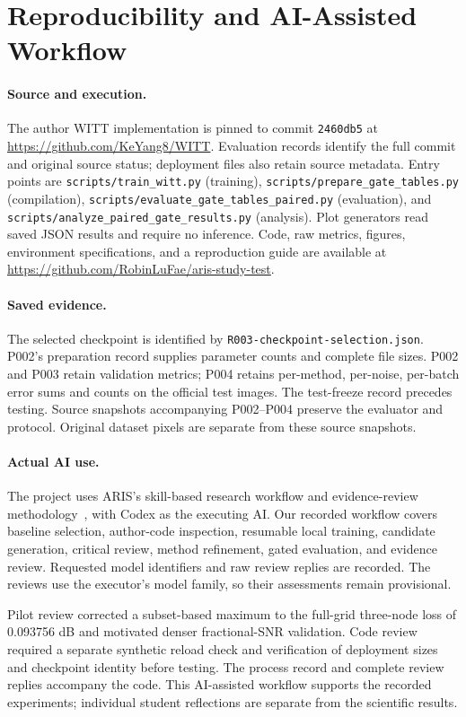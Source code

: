 \section{Reproducibility and AI-Assisted Workflow}
\paragraph{Source and execution.}
The author WITT implementation is pinned to commit \texttt{2460db5} at \url{https://github.com/KeYang8/WITT}. Evaluation records identify the full commit and original source status; deployment files also retain source metadata. Entry points are \nolinkurl{scripts/train_witt.py} (training), \nolinkurl{scripts/prepare_gate_tables.py} (compilation), \nolinkurl{scripts/evaluate_gate_tables_paired.py} (evaluation), and \nolinkurl{scripts/analyze_paired_gate_results.py} (analysis). Plot generators read saved JSON results and require no inference. Code, raw metrics, figures, environment specifications, and a reproduction guide are available at \url{https://github.com/RobinLuFae/aris-study-test}.

\paragraph{Saved evidence.}
The selected checkpoint is identified by \texttt{R003-checkpoint-selection.json}. P002's preparation record supplies parameter counts and complete file sizes. P002 and P003 retain validation metrics; P004 retains per-method, per-noise, per-batch error sums and counts on the official test images. The test-freeze record precedes testing. Source snapshots accompanying P002--P004 preserve the evaluator and protocol. Original dataset pixels are separate from these source snapshots.

\paragraph{Actual AI use.}
The project uses ARIS's skill-based research workflow and evidence-review methodology~\cite{yin2026aris,yang2026aris}, with Codex as the executing AI. Our recorded workflow covers baseline selection, author-code inspection, resumable local training, candidate generation, critical review, method refinement, gated evaluation, and evidence review. Requested model identifiers and raw review replies are recorded. The reviews use the executor's model family, so their assessments remain provisional.

Pilot review corrected a subset-based maximum to the full-grid three-node loss of 0.093756 dB and motivated denser fractional-SNR validation. Code review required a separate synthetic reload check and verification of deployment sizes and checkpoint identity before testing. The process record and complete review replies accompany the code. This AI-assisted workflow supports the recorded experiments; individual student reflections are separate from the scientific results.
